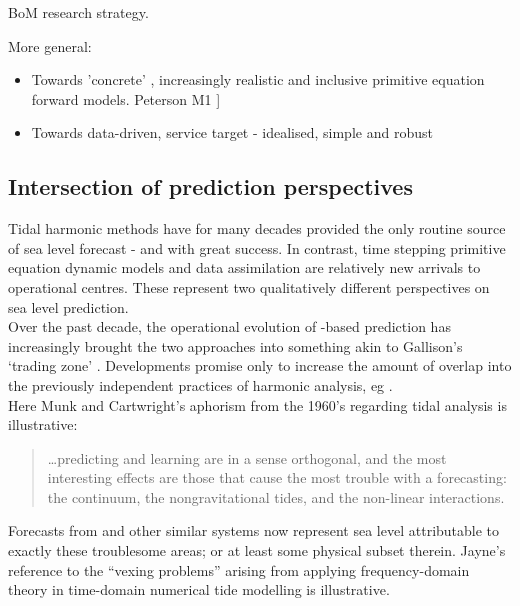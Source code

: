 BoM research strategy.


More general:

\begin{itemize}
    \item Towards 'concrete' , increasingly realistic and inclusive primitive equation forward models.
Peterson M1 ]\citep{Petersen:2012tr}
    \item Towards data-driven, service target - idealised, simple and robust 
\end{itemize}


\subsection{Intersection of prediction perspectives}
\label{S:two_perspectives}

Tidal harmonic methods have for many decades provided the only routine source of sea level forecast - and with great success.  
In contrast, time stepping primitive equation dynamic models and data assimilation are relatively new arrivals to operational centres.  
These represent two qualitatively different perspectives on sea level prediction.\\



Over the past decade, the operational evolution of \OGCM-based prediction has increasingly brought the two approaches into something akin to Gallison's `trading zone' \citep{Galison:1996uc}.
Developments promise only to increase the amount of overlap into the previously independent practices of harmonic analysis, eg \cite{Arbic:2010us}.\\
Here Munk and Cartwright's aphorism from the 1960's regarding tidal analysis is illustrative:
\begin{quote}
\dots predicting and learning are in a sense orthogonal, and the most interesting effects are those that cause the most trouble with a forecasting: the continuum, the nongravitational tides, and the non-linear interactions.\citep{Munk:1966ts} 
\end{quote}
Forecasts from \BL{} and other similar systems now represent sea level attributable to exactly these troublesome areas; or at least some physical subset therein.
Jayne's reference to the ``vexing problems'' \citep[pp812]{Jayne:2001tr} arising from applying frequency-domain theory in time-domain numerical tide modelling is illustrative.


